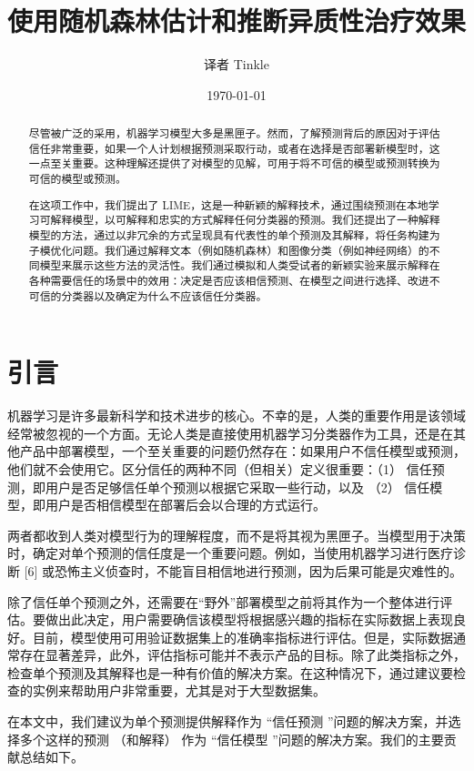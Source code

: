 \documentclass[12pt, a4paper]{ctexart} %
\title{使用随机森林估计和推断异质性治疗效果}
\author{译者 Tinkle}
\date{\today}
\begin{document}
\maketitle{}
\begin{abstract}
    尽管被广泛的采用，机器学习模型大多是黑匣子。然而，了解预测背后的原因对于评估信任非常重要，如果一个人计划根据预测采取行动，或者在选择是否部署新模型时，这一点至关重要。这种理解还提供了对模型的见解，可用于将不可信的模型或预测转换为可信的模型或预测。
    
    在这项工作中，我们提出了 LIME，这是一种新颖的解释技术，通过围绕预测在本地学习可解释模型，以可解释和忠实的方式解释任何分类器的预测。我们还提出了一种解释模型的方法，通过以非冗余的方式呈现具有代表性的单个预测及其解释，将任务构建为子模优化问题。我们通过解释文本（例如随机森林）和图像分类（例如神经网络）的不同模型来展示这些方法的灵活性。我们通过模拟和人类受试者的新颖实验来展示解释在各种需要信任的场景中的效用：决定是否应该相信预测、在模型之间进行选择、改进不可信的分类器以及确定为什么不应该信任分类器。
\end{abstract}

\section{引言}
机器学习是许多最新科学和技术进步的核心。不幸的是，人类的重要作用是该领域经常被忽视的一个方面。无论人类是直接使用机器学习分类器作为工具，还是在其他产品中部署模型，一个至关重要的问题仍然存在：如果用户不信任模型或预测，他们就不会使用它。区分信任的两种不同（但相关）定义很重要：（1） 信任预测，即用户是否足够信任单个预测以根据它采取一些行动，以及 （2） 信任模型，即用户是否相信模型在部署后会以合理的方式运行。

两者都收到人类对模型行为的理解程度，而不是将其视为黑匣子。当模型用于决策时，确定对单个预测的信任度是一个重要问题。例如，当使用机器学习进行医疗诊断 [6] 或恐怖主义侦查时，不能盲目相信地进行预测，因为后果可能是灾难性的。

除了信任单个预测之外，还需要在“野外”部署模型之前将其作为一个整体进行评估。要做出此决定，用户需要确信该模型将根据感兴趣的指标在实际数据上表现良好。目前，模型使用可用验证数据集上的准确率指标进行评估。但是，实际数据通常存在显著差异，此外，评估指标可能并不表示产品的目标。除了此类指标之外，检查单个预测及其解释也是一种有价值的解决方案。在这种情况下，通过建议要检查的实例来帮助用户非常重要，尤其是对于大型数据集。

在本文中，我们建议为单个预测提供解释作为 “信任预测 ”问题的解决方案，并选择多个这样的预测 （和解释） 作为 “信任模型 ”问题的解决方案。我们的主要贡献总结如下。
\end{document}
